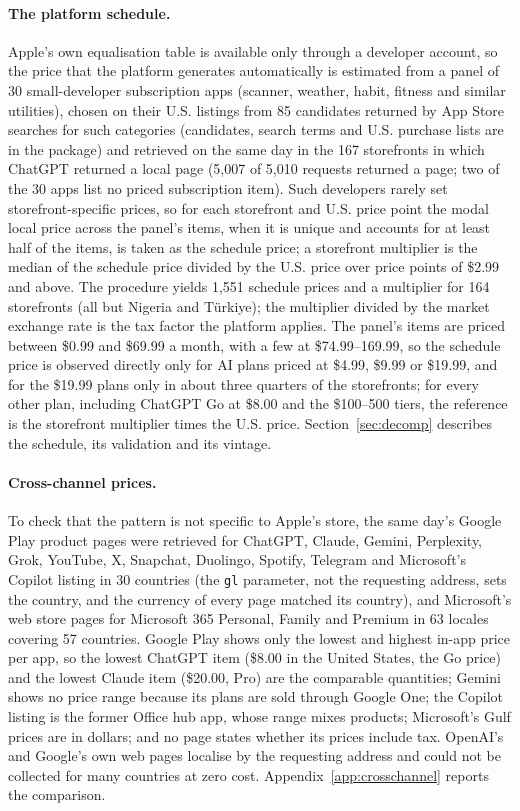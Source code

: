 \documentclass[11pt]{article}
\theoremstyle{definition}
\theoremstyle{remark}
\begin{document}
\paragraph{The platform schedule.} Apple's own equalisation table is available only through a developer account, so the price that the platform generates automatically is estimated from a panel of 30 small-developer subscription apps (scanner, weather, habit, fitness and similar utilities), chosen on their U.S. listings from 85 candidates returned by App Store searches for such categories (candidates, search terms and U.S. purchase lists are in the package) and retrieved on the same day in the 167 storefronts in which ChatGPT returned a local page (5,007 of 5,010 requests returned a page; two of the 30 apps list no priced subscription item). Such developers rarely set storefront-specific prices, so for each storefront and U.S. price point the modal local price across the panel's items, when it is unique and accounts for at least half of the items, is taken as the schedule price; a storefront multiplier is the median of the schedule price divided by the U.S. price over price points of \$2.99 and above. The procedure yields 1,551 schedule prices and a multiplier for 164 storefronts (all but Nigeria and T\"urkiye); the multiplier divided by the market exchange rate is the tax factor the platform applies. The panel's items are priced between \$0.99 and \$69.99 a month, with a few at \$74.99--169.99, so the schedule price is observed directly only for AI plans priced at \$4.99, \$9.99 or \$19.99, and for the \$19.99 plans only in about three quarters of the storefronts; for every other plan, including ChatGPT Go at \$8.00 and the \$100--500 tiers, the reference is the storefront multiplier times the U.S. price. Section~\ref{sec:decomp} describes the schedule, its validation and its vintage.

\paragraph{Cross-channel prices.} To check that the pattern is not specific to Apple's store, the same day's Google Play product pages were retrieved for ChatGPT, Claude, Gemini, Perplexity, Grok, YouTube, X, Snapchat, Duolingo, Spotify, Telegram and Microsoft's Copilot listing in 30 countries (the \texttt{gl} parameter, not the requesting address, sets the country, and the currency of every page matched its country), and Microsoft's web store pages for Microsoft 365 Personal, Family and Premium in 63 locales covering 57 countries. Google Play shows only the lowest and highest in-app price per app, so the lowest ChatGPT item (\$8.00 in the United States, the Go price) and the lowest Claude item (\$20.00, Pro) are the comparable quantities; Gemini shows no price range because its plans are sold through Google One; the Copilot listing is the former Office hub app, whose range mixes products; Microsoft's Gulf prices are in dollars; and no page states whether its prices include tax. OpenAI's and Google's own web pages localise by the requesting address and could not be collected for many countries at zero cost. Appendix~\ref{app:crosschannel} reports the comparison.
\end{document}
